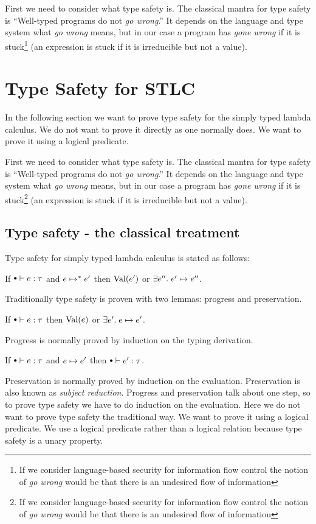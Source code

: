 First we need to consider what type safety is. The classical mantra for type safety is ``Well-typed programs do not \emph{go wrong}.'' It depends on the language and type system what \emph{go wrong} means, but in our case a program has \emph{gone wrong} if it is stuck\footnote{If we consider language-based security for information flow control the notion of \emph{go wrong} would be that there is an undesired flow of information} (an expression is stuck if it is irreducible but not a value). 

\section*{Type Safety for STLC}
In the following section we want to prove type safety for the simply typed lambda calculus. We do not want to prove it directly as one normally does. We want to prove it using a logical predicate.

First we need to consider what type safety is. The classical mantra for type safety is ``Well-typed programs do not \emph{go wrong}.'' It depends on the language and type system what \emph{go wrong} means, but in our case a program has \emph{gone wrong} if it is stuck\footnote{If we consider language-based security for information flow control the notion of \emph{go wrong} would be that there is an undesired flow of information} (an expression is stuck if it is irreducible but not a value). 
\subsection*{Type safety - the classical treatment}
Type safety for simply typed lambda calculus is stated as follows:
\begin{stlctypesafety}
  If $\mtenv \vdash e : \tau$ and $e \mapsto^{*} e'$ then $\operatorname{Val}(e')$ or $\exists e''. \; e' \mapsto e''$.
\end{stlctypesafety}
Traditionally type safety is proven with two lemmas: progress and preservation.
\begin{progress}[Progress]
  If $\mtenv \vdash e : \tau$ then $\operatorname{Val}(e)$ or $\exists e'. \; e \mapsto e'$.
\end{progress}
Progress is normally proved by induction on the typing derivation.
\begin{preservation}[Preservation]
  If $\mtenv \vdash e : \tau$ and $e \mapsto e'$ then $\mtenv \vdash e' : \tau$.
\end{preservation}
Preservation is normally proved by induction on the evaluation.
Preservation is also known as \emph{subject reduction}. Progress and preservation talk about one step, so to prove type safety we have to do induction on the evaluation. Here we do not want to prove type safety the traditional way. We want to prove it using a logical predicate. We use a logical predicate rather than a logical relation because type safety is a unary property.


